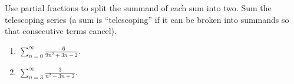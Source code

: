 Use partial fractions to split the summand of each sum into two. Sum the telescoping series (a sum is ``telescoping'' if it can be broken into summands so that consecutive terms cancel).
\begin{enumerate}
\item $\sum\limits_{n=0}^{\infty} \frac{-6}{9 n^{2}+3 n-2}$.
\item $\sum\limits_{n=3}^{\infty} \frac{3}{n^{2}-3 n+2}$.
\end{enumerate}